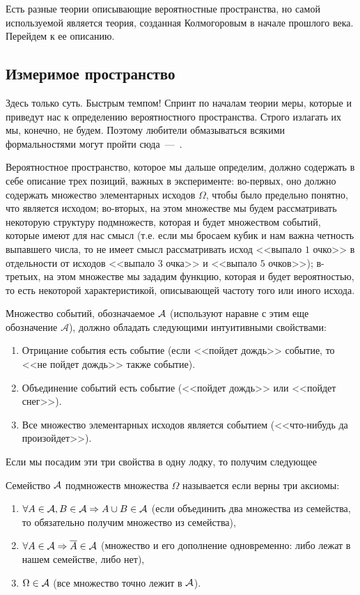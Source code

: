 \documentclass[../TV&MS.tex]{subfiles}
\begin{document}
Есть разные теории описывающие вероятностные пространства, но самой используемой является 
теория, созданная Колмогоровым в начале прошлого века. Перейдем к ее описанию.

\subsection{Измеримое пространство}
	
\qquad Здесь только суть. Быстрым темпом! Спринт по началам теории меры,
которые и приведут нас к определению вероятностного пространства. 
Строго излагать их мы, конечно, не будем. Поэтому любители обмазываться всякими 
формальностями могут пройти сюда~---~\cite{Gusev}.

Вероятностное пространство, которое мы дальше определим, должно 
содержать в себе описание трех позиций, важных в эксперименте: 
во-первых, оно должно содержать множество элементарных исходов $\Omega$,
чтобы было предельно понятно, что является исходом; во-вторых,
на этом множестве мы будем рассматривать некоторую структуру подмножеств,
которая и будет множеством событий, которые имеют для нас смысл (т.е.
если мы бросаем кубик и нам важна четность выпавшего числа, то не имеет
смысл рассматривать исход <<выпало $1$ очко>> в отдельности от исходов 
<<выпало $3$ очка>> и <<выпало $5$ очков>>); в-третьих, на этом множестве мы 
зададим функцию, которая и будет вероятностью, то есть некоторой 
характеристикой, описывающей частоту того или иного исхода.

Множество событий, обозначаемое $\mathcal{A}$ (используют наравне с этим еще обозначение 
$\mathscr{A}$), должно обладать следующими интуитивными свойствами:
\begin{enumerate}
	\item Отрицание события есть событие (если <<пойдет дождь>> событие, 
	то <<не пойдет дождь>> также событие).
	\item Объединение событий есть событие (<<пойдет дождь>> или <<пойдет снег>>).
	\item Все множество элементарных исходов является событием (<<что-нибудь да произойдет>>).
\end{enumerate}

Если мы посадим эти три свойства в одну лодку, то получим следующее 
\begin{Def}
	Семейство $\mathcal{A}$ подмножеств множества $\Omega$  называется  если 
	верны три аксиомы:
\begin{enumerate}[label=(\roman*)]
	\item $\forall A \in \mathcal{A}, B\in \mathcal{A} \Rightarrow A \cup B \in \mathcal{A}$ (если объединить
	два множества из семейства, то обязательно получим множество из семейства),
	\item $\forall A \in \mathcal{A} \Rightarrow \overline{A} \in \mathcal{A}$ (множество и его дополнение
	одновременно: либо лежат в нашем семействе, либо нет),
	\item $\Omega \in \mathcal{A}$ (все множество точно лежит в $\mathcal{A}$).
\end{enumerate}\smallskip
\end{Def}
\end{document}
